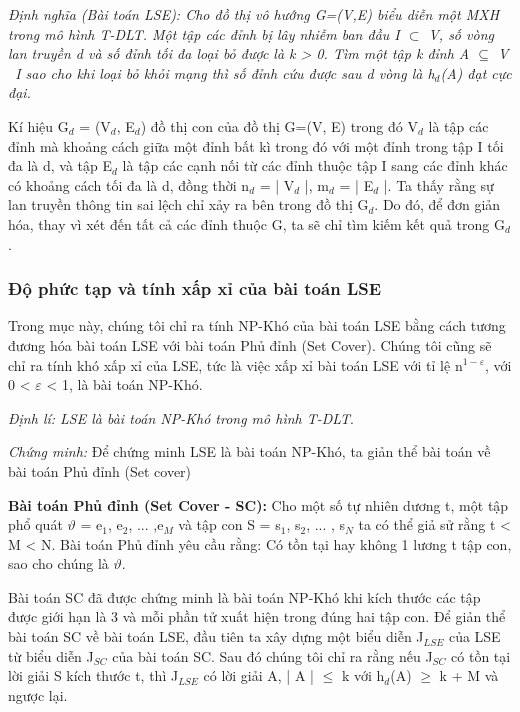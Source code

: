  		{\itshape Định nghĩa (Bài toán LSE): Cho đồ thị vô hướng G=(V,E) biểu diễn một MXH trong mô hình T-DLT. Một tập các đỉnh bị lây nhiễm ban đầu I $\subset$ V, số vòng lan truyền d và số đỉnh tối đa loại bỏ được là k > 0. Tìm một tập k đỉnh  A $\subseteq$ V \ I sao cho khi loại bỏ khỏi mạng thì số đỉnh cứu được sau d vòng là h$_{d}$(A) đạt cực đại.}
 		
 		Kí hiệu G$_{d}$ = (V$_{d}$, E$_{d}$) đồ thị con của đồ thị G=(V, E) trong đó V$_{d}$ là tập các đỉnh mà khoảng cách giữa một đỉnh bất kì trong đó với một đỉnh trong tập I tối đa là d, và tập E$_{d}$ là tập các cạnh nối từ các đỉnh thuộc tập I sang các đỉnh khác có khoảng cách tối đa là d, đồng thời n$_{d}$ = | V$_{d}$ |, m$_{d}$ = | E$_{d}$ |. Ta thấy rằng sự lan truyền thông tin sai lệch chỉ xảy ra bên trong đồ thị G$_{d}$. Do đó, để đơn giản hóa, thay vì xét đến tất cả các đỉnh thuộc G, ta sẽ chỉ tìm kiếm kết quả trong G$_{d}$.
 		
 		\subsubsection{Độ phức tạp và tính xấp xỉ của bài toán LSE}
 		Trong mục này, chúng tôi chỉ ra tính NP-Khó của bài toán LSE bằng cách tương đương hóa bài toán LSE với bài toán Phủ đỉnh (Set Cover). Chúng tôi cũng sẽ chỉ ra tính khó xấp xỉ của LSE, tức là việc xấp xỉ bài toán LSE với tỉ lệ n$^{1 - \varepsilon}$, với 0 < $\varepsilon$ < 1, là bài toán NP-Khó.
 		
 		{\itshape Định lí: LSE là bài toán NP-Khó trong mô hình T-DLT}.
 		
 		{\itshape Chứng minh:} Để chứng minh LSE là bài toán NP-Khó, ta giản thể bài toán về bài toán Phủ đỉnh (Set cover) 
 		
 		{\bfseries Bài toán Phủ đỉnh (Set Cover - SC):} Cho một số tự nhiên dương t, một tập phổ quát $\vartheta$ = {e$_{1}$, e$_{2}$, ... ,e$_{M}$} và tập con S = {s$_{1}$, s$_{2}$, ... , s$_{N}$} ta có thể giả sử rằng t < M < N. Bài toán Phủ đỉnh yêu cầu rằng: Có tồn tại hay không 1 lương t tập con, sao cho chúng là $\vartheta$.
 		
 		Bài toán SC đã được chứng minh là bài toán NP-Khó khi kích thước các tập được giới hạn là 3 và mỗi phần tử xuất hiện trong đúng hai tập con. Để giản thể bài toán SC về bài toán LSE, đầu tiên ta xây dựng một biểu diễn J$_{LSE}$ của LSE từ biểu diễn J$_{SC}$ của bài toán SC. Sau đó chúng tôi chỉ ra rằng nếu J$_{SC}$ có tồn tại lời giải S kích thước t, thì J$_{LSE}$ có lời giải A, | A | $\leq$ k với h$_{d}$(A) $\geq$ k + M và ngược lại.
 		
